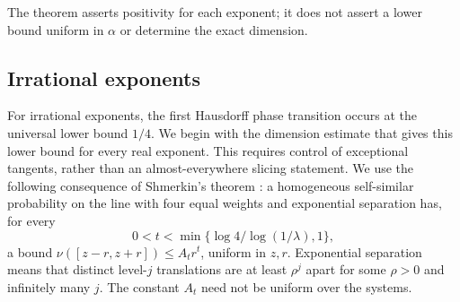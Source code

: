\documentclass[11pt,a4paper]{amsart}
\numberwithin{equation}{section}
\theoremstyle{definition}
\begin{document}
The theorem asserts positivity for each exponent; it does not
assert a lower bound uniform in \(\alpha\) or determine the exact dimension.


\subsection{Irrational exponents}\label{subsec:irrational}\label{subsec:universal}

For irrational exponents, the first Hausdorff phase transition occurs
at the universal lower bound \(1/4\). We begin with the dimension
estimate that gives this lower bound for every real exponent. This requires
control of exceptional tangents, rather than an almost-everywhere
slicing statement. We use the following consequence of Shmerkin's
theorem \cite[Theorem~6.2]{Shmerkin2019}: a homogeneous self-similar
probability on the line with four equal weights and exponential
separation has, for every
\[
0<t<\min\{\log4/\log(1/\lambda),1\},
\]
a bound \(\nu([z-r,z+r])\leq A_t r^t\), uniform in \(z,r\).
Exponential separation means that distinct level-\(j\) translations
are at least \(\rho^j\) apart for some \(\rho>0\) and infinitely many
\(j\). The constant \(A_t\) need not be uniform over the systems.
\end{document}
